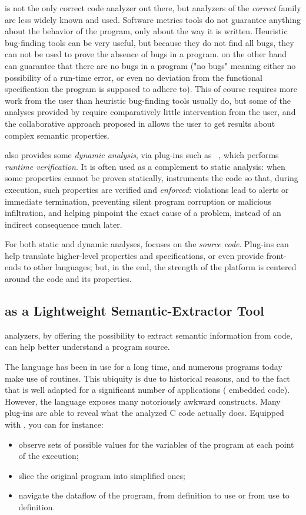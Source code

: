 \FramaC is not the only correct code analyzer out there, but analyzers of the
\emph{correct} family are less widely known and used. Software metrics tools do
not guarantee anything about the behavior of the program, only about the way it
is written. Heuristic bug-finding tools can be very useful, but because they do
not find all bugs, they can not be used to prove the absence of bugs in a
program. \FramaC on the other hand can guarantee that there are no bugs in a
program ("no bugs" meaning either no possibility of a run-time error, or even
no deviation from the functional specification the program is supposed to
adhere to). This of course requires more work from the user than heuristic
bug-finding tools usually do, but some of the analyses provided by \FramaC
require comparatively little intervention from the user, and the collaborative
approach proposed in \FramaC allows the user to get results about complex
semantic properties.

\FramaC also provides some {\em dynamic analysis}, via plug-ins such as
~\cite{eacsl}, which performs {\em runtime verification}.
It is often used as a complement to static analysis: when some properties
cannot be proven statically,  instruments the code so that,
during execution, such properties are verified and {\em enforced}:
violations lead to alerts or immediate termination, preventing silent program
corruption or malicious infiltration, and helping pinpoint the exact cause
of a problem, instead of an indirect consequence much later.

For both static and dynamic analyses, \FramaC focuses on the {\em source code}.
Plug-ins can help translate higher-level properties and specifications, or
even provide front-ends to other languages; but, in the end, the strength of
the platform is centered around the code and its properties.

\subsection{\FramaC as a Lightweight Semantic-Extractor Tool}

\FramaC analyzers, by offering the possibility to extract semantic information
from \C code, can help better understand a program source.

The \C language has been in use for a long time, and numerous programs today
make use of \C routines. This ubiquity is due to historical reasons, and to the
fact that \C is well adapted for a significant number of applications (\eg
embedded code). However, the \C language exposes many notoriously awkward
constructs.
Many \FramaC plug-ins are able to reveal what the analyzed C code actually
does. Equipped with \FramaC, you can for instance:
\begin{itemize}
\item observe sets of possible values for the variables of the program at each
  point of the execution;
\item slice the original program into simplified ones;
\item navigate the dataflow of the program, from definition to use or from use
  to definition.
\end{itemize}

